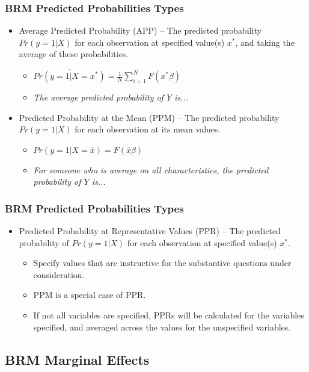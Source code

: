 \documentclass{beamer}
\begin{document}
\begin{frame}
	\frametitle{BRM Predicted Probabilities Types}
		\begin{itemize}
			\item Average Predicted Probability (APP) -- The predicted probability $Pr\left(y=1|X\right)$ for each observation at specified value(s) $x^{*}$, and taking the average of these probabilities.
				\begin{itemize}
					\item $\overline{Pr\left(y=1|X=x^{*}\right)}=\frac{1}{N}\sum_{i=1}^{N}F\left(x^{*}\beta\right)$
					\item \textit{The average predicted probability of $Y$ is...}
				\end{itemize}
			\item Predicted Probability at the Mean (PPM) -- The predicted probability $Pr\left(y=1|X\right)$ for each observation at its mean values.
				\begin{itemize}
					\item $Pr\left(y=1|X=\bar{x}\right)=F\left(\bar{x}\beta\right)$
					\item \textit{For someone who is average on all characteristics, the predicted probability of $Y$ is...}
				\end{itemize}
		\end{itemize}
\end{frame}

\begin{frame}
	\frametitle{BRM Predicted Probabilities Types}
		\begin{itemize}
			\item Predicted Probability at Representative Values (PPR) -- The predicted probability of $Pr\left(y=1|X\right)$ for each observation at specified value(s) $x^{*}$.
				\begin{itemize}
					\item Specify values that are instructive for the substantive questions under consideration.
					\item PPM is a special case of PPR.
					\item If not all variables are specified, PPRs will be calculated for the variables specified, and averaged across the values for the unspecified variables.
				\end{itemize}
		\end{itemize}
\end{frame}

\subsection{BRM Marginal Effects}
\end{document}
